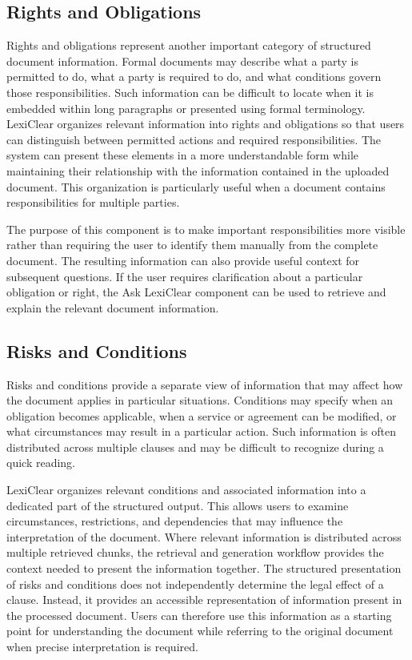 \documentclass[12pt,a4paper,oneside]{report}
\begin{document}
\subsection{Rights and Obligations}

Rights and obligations represent another important category of structured document information. Formal documents may describe what a party is permitted to do, what a party is required to do, and what conditions govern those responsibilities. Such information can be difficult to locate when it is embedded within long paragraphs or presented using formal terminology. LexiClear organizes relevant information into rights and obligations so that users can distinguish between permitted actions and required responsibilities. The system can present these elements in a more understandable form while maintaining their relationship with the information contained in the uploaded document. This organization is particularly useful when a document contains responsibilities for multiple parties.

The purpose of this component is to make important responsibilities more visible rather than requiring the user to identify them manually from the complete document. The resulting information can also provide useful context for subsequent questions. If the user requires clarification about a particular obligation or right, the Ask LexiClear component can be used to retrieve and explain the relevant document information.

\subsection{Risks and Conditions}

Risks and conditions provide a separate view of information that may affect how the document applies in particular situations. Conditions may specify when an obligation becomes applicable, when a service or agreement can be modified, or what circumstances may result in a particular action. Such information is often distributed across multiple clauses and may be difficult to recognize during a quick reading.

LexiClear organizes relevant conditions and associated information into a dedicated part of the structured output. This allows users to examine circumstances, restrictions, and dependencies that may influence the interpretation of the document. Where relevant information is distributed across multiple retrieved chunks, the retrieval and generation workflow provides the context needed to present the information together. The structured presentation of risks and conditions does not independently determine the legal effect of a clause. Instead, it provides an accessible representation of information present in the processed document. Users can therefore use this information as a starting point for understanding the document while referring to the original document when precise interpretation is required.
\end{document}
